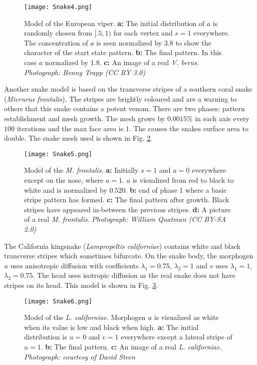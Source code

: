 \begin{figure}[ht]
	\centering
	\texttt{[image: Snake4.png]}
	\caption{Model of the European viper. \textbf{a:} The initial distribution of $a$ is randomly chosen from $[.5, 1)$ for each vertex and $s=1$ everywhere. The concentration of $a$ is seen normalized by 3.8 to show the character of the start state pattern. \textbf{b:} The final pattern. In this case $a$ normalized by $1.8$. \textbf{c:} An image of a real \textit{V. berus}. \textit{Photograph: Benny Trapp (CC BY 3.0)}}
	\label{fig:Snake4}
\end{figure}

\newpage
Another snake model is based on the transverse stripes of a southern coral snake (\textit{Micrurus frontalis}). The stripes are brightly coloured and are a warning to others that this snake contains a potent venom. There are two phases: pattern establishment and mesh growth. The mesh grows by $0.0015\%$ in each axis every $100$ iterations and the max face area is $1$. The causes the snakes surface area to double. The snake mesh used is shown in Fig. \ref{fig:Snake5}.

\begin{figure}[ht]
	\centering
	\texttt{[image: Snake5.png]}
	\caption{Model of the \textit{M. frontalis}. \textbf{a:} Initially $s=1$ and $a=0$ everywhere except on the nose, where $a=1$. $a$ is visualized from red to black to white and is normalized by $0.520$. \textbf{b:} end of phase 1 where a basic stripe pattern has formed. \textbf{c:} The final pattern after growth. Black stripes have appeared in-between the previous stripes. \textbf{d:} A picture of a real \textit{M. frontalis}. \textit{Photograph: William Quatman (CC BY-SA 2.0)}}
	\label{fig:Snake5}
\end{figure}

\newpage 

The California kingsnake (\textit{Lampropeltis californiae}) contains white and black transverse stripes which sometimes bifurcate. On the snake body, the morphogen $u$ uses  anisotropic diffusion with coefficients $\lambda_{1}=0.75$, $\lambda_{2}=1$ and $v$ uses $\lambda_{1}=1$, $\lambda_{2}=0.75$. The head uses isotropic diffusion as the real snake does not have stripes on its head. This model is shown in Fig. \ref{fig:Snake6}.

\begin{figure}[ht]
	\centering
	\texttt{[image: Snake6.png]}
	\caption{Model of the \textit{L. californiae}. Morphogen $u$ is visualized as white when its value is low and black when high. \textbf{a:} The initial distribution is $u=0$ and $v=1$ everywhere except a lateral stripe  of $u=1$. \textbf{b:} The final pattern. \textbf{c:} An image of a real \textit{L. californiae}. \textit{Photograph: courtesy of David Steen}}
	\label{fig:Snake6}
\end{figure}

